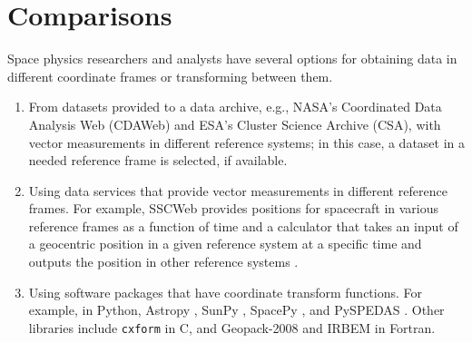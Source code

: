 \documentclass[draft]{agujournal2019}
\begin{document}
\begin{itemize}
     


\end{itemize}

\section{Comparisons}
\label{sect:comparisons}

Space physics researchers and analysts have several options for obtaining data in different coordinate frames or transforming between them.

\begin{enumerate}

    \parskip 0.1in 

    \item From datasets provided to a data archive, e.g., NASA's Coordinated Data Analysis Web (CDAWeb) and ESA's Cluster Science Archive (CSA), with vector measurements in different reference systems; in this case, a dataset in a needed reference frame is selected, if available.

    \item Using data services that provide vector measurements in different reference frames. For example, SSCWeb provides positions for spacecraft in various reference frames as a function of time \cite{SSCWeb} and a calculator that takes an input of a geocentric position in a given reference system at a specific time and outputs the position in other reference systems \cite{SSCWebCoordinateCalculator}.

    \item Using software packages that have coordinate transform functions. For example, in Python, Astropy \cite{AstroPy2022}, SunPy \cite{SunPy}, SpacePy \cite{SpacePy}, and PySPEDAS \cite{Angelopoulos2024}. Other libraries include \texttt{cxform} \cite{cxform} in C, and Geopack-2008 \cite{Tsyganenko2008} and IRBEM \cite{IRBEM2022} in Fortran.

\end{enumerate}
\end{document}
